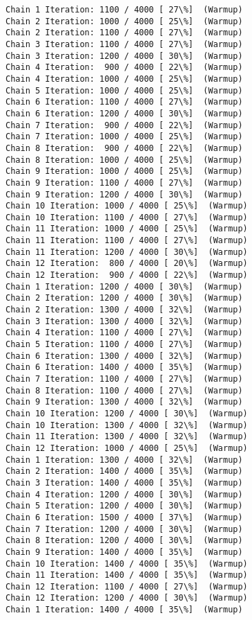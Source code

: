 \documentclass[11pt]{article}
\begin{document}
\begin{Verbatim}[commandchars=\\\{\}]
Chain 1 Iteration: 1100 / 4000 [ 27\%]  (Warmup)
Chain 2 Iteration: 1000 / 4000 [ 25\%]  (Warmup)
Chain 2 Iteration: 1100 / 4000 [ 27\%]  (Warmup)
Chain 3 Iteration: 1100 / 4000 [ 27\%]  (Warmup)
Chain 3 Iteration: 1200 / 4000 [ 30\%]  (Warmup)
Chain 4 Iteration:  900 / 4000 [ 22\%]  (Warmup)
Chain 4 Iteration: 1000 / 4000 [ 25\%]  (Warmup)
Chain 5 Iteration: 1000 / 4000 [ 25\%]  (Warmup)
Chain 6 Iteration: 1100 / 4000 [ 27\%]  (Warmup)
Chain 6 Iteration: 1200 / 4000 [ 30\%]  (Warmup)
Chain 7 Iteration:  900 / 4000 [ 22\%]  (Warmup)
Chain 7 Iteration: 1000 / 4000 [ 25\%]  (Warmup)
Chain 8 Iteration:  900 / 4000 [ 22\%]  (Warmup)
Chain 8 Iteration: 1000 / 4000 [ 25\%]  (Warmup)
Chain 9 Iteration: 1000 / 4000 [ 25\%]  (Warmup)
Chain 9 Iteration: 1100 / 4000 [ 27\%]  (Warmup)
Chain 9 Iteration: 1200 / 4000 [ 30\%]  (Warmup)
Chain 10 Iteration: 1000 / 4000 [ 25\%]  (Warmup)
Chain 10 Iteration: 1100 / 4000 [ 27\%]  (Warmup)
Chain 11 Iteration: 1000 / 4000 [ 25\%]  (Warmup)
Chain 11 Iteration: 1100 / 4000 [ 27\%]  (Warmup)
Chain 11 Iteration: 1200 / 4000 [ 30\%]  (Warmup)
Chain 12 Iteration:  800 / 4000 [ 20\%]  (Warmup)
Chain 12 Iteration:  900 / 4000 [ 22\%]  (Warmup)
Chain 1 Iteration: 1200 / 4000 [ 30\%]  (Warmup)
Chain 2 Iteration: 1200 / 4000 [ 30\%]  (Warmup)
Chain 2 Iteration: 1300 / 4000 [ 32\%]  (Warmup)
Chain 3 Iteration: 1300 / 4000 [ 32\%]  (Warmup)
Chain 4 Iteration: 1100 / 4000 [ 27\%]  (Warmup)
Chain 5 Iteration: 1100 / 4000 [ 27\%]  (Warmup)
Chain 6 Iteration: 1300 / 4000 [ 32\%]  (Warmup)
Chain 6 Iteration: 1400 / 4000 [ 35\%]  (Warmup)
Chain 7 Iteration: 1100 / 4000 [ 27\%]  (Warmup)
Chain 8 Iteration: 1100 / 4000 [ 27\%]  (Warmup)
Chain 9 Iteration: 1300 / 4000 [ 32\%]  (Warmup)
Chain 10 Iteration: 1200 / 4000 [ 30\%]  (Warmup)
Chain 10 Iteration: 1300 / 4000 [ 32\%]  (Warmup)
Chain 11 Iteration: 1300 / 4000 [ 32\%]  (Warmup)
Chain 12 Iteration: 1000 / 4000 [ 25\%]  (Warmup)
Chain 1 Iteration: 1300 / 4000 [ 32\%]  (Warmup)
Chain 2 Iteration: 1400 / 4000 [ 35\%]  (Warmup)
Chain 3 Iteration: 1400 / 4000 [ 35\%]  (Warmup)
Chain 4 Iteration: 1200 / 4000 [ 30\%]  (Warmup)
Chain 5 Iteration: 1200 / 4000 [ 30\%]  (Warmup)
Chain 6 Iteration: 1500 / 4000 [ 37\%]  (Warmup)
Chain 7 Iteration: 1200 / 4000 [ 30\%]  (Warmup)
Chain 8 Iteration: 1200 / 4000 [ 30\%]  (Warmup)
Chain 9 Iteration: 1400 / 4000 [ 35\%]  (Warmup)
Chain 10 Iteration: 1400 / 4000 [ 35\%]  (Warmup)
Chain 11 Iteration: 1400 / 4000 [ 35\%]  (Warmup)
Chain 12 Iteration: 1100 / 4000 [ 27\%]  (Warmup)
Chain 12 Iteration: 1200 / 4000 [ 30\%]  (Warmup)
Chain 1 Iteration: 1400 / 4000 [ 35\%]  (Warmup)

\end{Verbatim}
\end{document}
